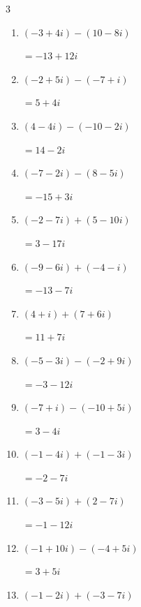 \begin{multicols}{3}
\begin{enumerate}
        $\displaystyle =-6-12i$

  \item $\displaystyle (-3+4i) - (10-8i)$

        $\displaystyle =-13+12i$

  \item $\displaystyle (-2+5i) - (-7+i)$

        $\displaystyle =5+4i$

  \item $\displaystyle (4-4i) - (-10-2i)$

        $\displaystyle =14-2i$

  \item $\displaystyle (-7-2i) - (8-5i)$

        $\displaystyle =-15+3i$

  \item $\displaystyle (-2-7i) + (5-10i)$

        $\displaystyle =3-17i$

  \item $\displaystyle (-9-6i) + (-4-i)$

        $\displaystyle =-13-7i$

  \item $\displaystyle (4+i) + (7+6i)$

        $\displaystyle =11+7i$

  \item $\displaystyle (-5-3i) - (-2+9i)$

        $\displaystyle =-3-12i$

  \item $\displaystyle (-7+i) - (-10+5i)$

        $\displaystyle =3-4i$

  \item $\displaystyle (-1-4i) + (-1-3i)$

        $\displaystyle =-2-7i$

  \item $\displaystyle (-3-5i) + (2-7i)$

        $\displaystyle =-1-12i$

  \item $\displaystyle (-1+10i) - (-4+5i)$

        $\displaystyle =3+5i$

\columnbreak %

\resetques

  \item $\displaystyle (-1-2i) + (-3-7i)$


\end{enumerate}
\end{multicols}
